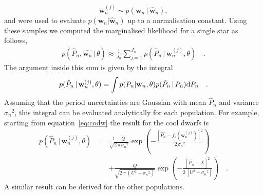 \documentclass[useAMS, usenatbib]{mn2e}
\newcommand{\w}{\mathbf{w}}
\begin{document}
\begin{equation}
\w_n^{(j)} \sim p(\w_n\,|\,\hat{\w}_n),
\end{equation}
and were used to evaluate $p(\mathbf{w}_n|\hat{\mathbf{w}}_n)$ up to a
normalisation constant.
Using these samples we computed the marginalised likelihood for a single
star as follows,
\begin{align}
	p(\hat{P}_n,\hat{\w_n}\,|\,\theta) \approx \frac{1}{J_n}
	\sum_{j=1}^{J_n}p(\hat{P}_n\,|\,\mathbf{w}_n^{(j)},\theta) \quad.
\end{align}
The argument inside this sum is given by the integral
\begin{equation}
p(\hat{P}_n\,|\,\mathbf{w}_n^{(j)},\theta) =
    \int p(P_n|\w_n,\theta) p(\hat{P}_n\,|\,P_n) {\rm d}P_n \quad.
\end{equation}
Assuming that the period uncertainties are Gaussian with mean $\hat{P}_n$
and variance ${\sigma_n}^2$, this integral can be evaluated analytically for
each population.
For example, starting from equation~\ref{eq:codw} the result for the cool
dwarfs is
\begin{eqnarray}
p(\hat{P}_n\,|\,\mathbf{w}_n^{(j)},\theta) &=&
    \frac{1-Q}{\sqrt{2\,\pi\,{\sigma_n}^2}} \exp\left( -
        \frac{\left[\hat{P_n} - f_\theta (\w_n^{(j)}) \right] ^2}
             {2\,{\sigma_n}^2}\right) \nonumber\\
    && +
    \frac{Q}{\sqrt{2\,\pi\,(U^2 + {\sigma_n}^2)}} \exp\left( -
        \frac{[\hat{P_n} - X] ^2}{2\,[U^2 + {\sigma_n}^2]}\right) \quad.
\end{eqnarray}
A similar result can be derived for the other populations.
\end{document}
